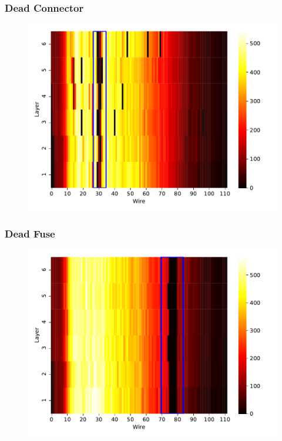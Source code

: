 \begin{frame}
  \frametitle{Dead Connector}
  \begin{figure}
    \includegraphics[width=.85\textwidth]{../figures/dead_connector}
  \end{figure}
\end{frame}

\begin{frame}
  \frametitle{Dead Fuse}
  \begin{figure}
    \includegraphics[width=.85\textwidth]{../figures/dead_fuse}
  \end{figure}
\end{frame}

